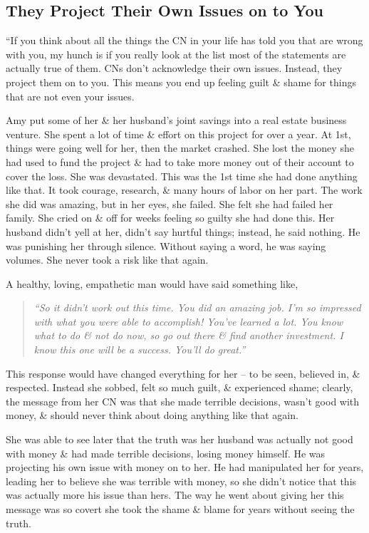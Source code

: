 \documentclass{article}
\numberwithin{equation}{section}
\begin{document}
\subsection{They Project Their Own Issues on to You}
``If you think about all the things the CN in your life has told you that are wrong with you, my hunch is if you really look at the list most of the statements are actually true of them. CNs don't acknowledge their own issues. Instead, they project them on to you. This means you end up feeling guilt \& shame for things that are not even your issues.

Amy put some of her \& her husband's joint savings into a real estate business venture. She spent a lot of time \& effort on this project for over a year. At 1st, things were going well for her, then the market crashed. She lost the money she had used to fund the project \& had to take more money out of their account to cover the loss. She was devastated. This was the 1st time she had done anything like that. It took courage, research, \& many hours of labor on her part. The work she did was amazing, but in her eyes, she failed. She felt she had failed her family. She cried on \& off for weeks feeling so guilty she had done this. Her husband didn't yell at her, didn't say hurtful things; instead, he said nothing. He was punishing her through silence. Without saying a word, he was saying volumes. She never took a risk like that again.

A healthy, loving, empathetic man would have said something like,
\begin{quotation}\it
	``So it didn't work out this time. You did an amazing job. I'm so impressed with what you were able to accomplish! You've learned a lot. You know what to do \& not do now, so go out there \& find another investment. I know this one will be a success. You'll do great.''
\end{quotation}
This response would have changed everything for her -- to be seen, believed in, \& respected. Instead she sobbed, felt so much guilt, \& experienced shame; clearly, the message from her CN was that she made terrible decisions, wasn't good with money, \& should never think about doing anything like that again.

She was able to see later that the truth was her husband was actually not good with money \& had made terrible decisions, losing money himself. He was projecting his own issue with money on to her. He had manipulated her for years, leading her to believe she was terrible with money, so she didn't notice that this was actually more his issue than hers. The way he went about giving her this message was so covert she took the shame \& blame for years without seeing the truth.
\end{document}
